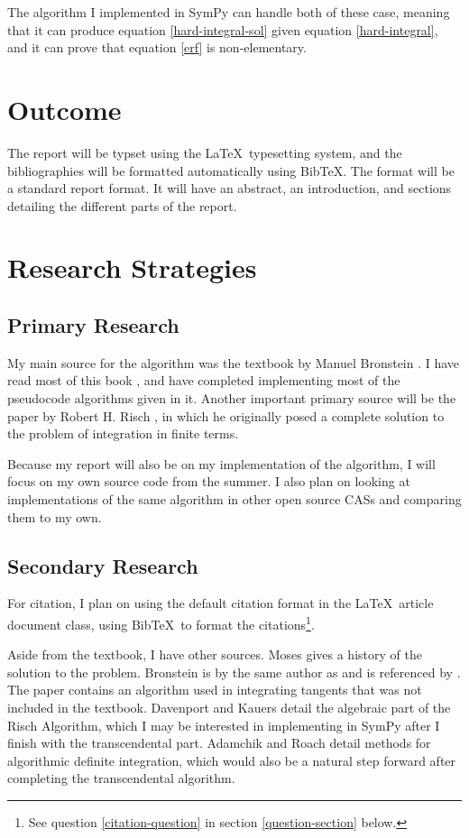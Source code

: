 \documentclass[12pt]{article}
\newcommand{\BibTeX}{{\sc Bib}\TeX}
\newcommand{\bibtex}{{\sc Bib}\TeX\ }
\newcommand{\latex}{\LaTeX\ }
\begin{document}
The algorithm I implemented in Sym\-Py can handle both of these case,
meaning that it can produce equation \ref{hard-integral-sol} given
equation \ref{hard-integral}, and it can prove that equation \ref{erf}
is non-elementary.

\section{Outcome}
The report will be typset using the \latex typesetting system, and the
bibliographies will be formatted automatically using \BibTeX.  The
format will be a standard report format.  It will have an abstract, an
introduction, and sections detailing the different parts of the report.
\section{Research Strategies}
\subsection{Primary Research}
My main source for the algorithm was the textbook by Manuel Bronstein
\cite{bronstein2005symbolic}.  I have read most of this book , and have
completed implementing most of the pseudocode algorithms given in it.
Another important primary source will be the paper by Robert H. Risch
\cite{risch1969problem}, in which he originally posed a complete
solution to the problem of integration in finite terms.  

Because my report will also be on my implementation of the algorithm, I
will focus on my own source code from the summer.  I also plan on
looking at implementations of the same algorithm in other open source
CASs and comparing them to my own. \subsection{Secondary Research}
\label{secondary-research} For citation, I plan on using the default
citation format in the \latex article document class, using \bibtex to
format the citations\footnote{See question \ref{citation-question} in
section \ref{question-section} below.}.

Aside from the textbook, I have other sources. Moses
\cite{moses1971symbolic} gives a history of the solution to the problem.
Bronstein \cite{bronstein1989simplification} is by the same author as
and is referenced by \cite{bronstein2005symbolic}.  The paper contains
an algorithm used in integrating tangents that was not included in the
textbook. Davenport \cite{davenport1984integration} and Kauers
\cite{kauers2008integration} detail the algebraic part of the Risch
Algorithm, which I may be interested in implementing in Sym\-Py after I
finish with the transcendental part. Adamchik
\cite{adamchik1990hypergeometric} and Roach \cite{roach1997meijerg}
detail methods for algorithmic definite integration, which would also be
a natural step forward after completing the transcendental algorithm.
\end{document}

